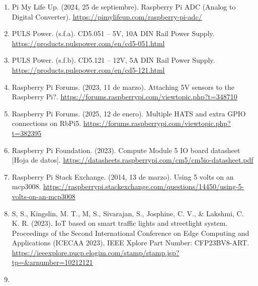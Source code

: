 \documentclass[12pt,a4paper,oneside]{report}
\providecommand{\ul}[1]{\underline{#1}}
\begin{document}
\begin{enumerate}
  Pasajero7. (2023). Semáforos inteligentes: La clave para ciudades más eficientes y seguras. \href{https://www.pasajero7.com/semaforos-inteligentes-la-clave-para-ciudades-mas-eficientes-y-seguras/}{\ul{https://www.pasajero7.com/semaforos-inteligentes-la-clave-para-ciudades-mas-eficientes-y-seguras/}}
\item
  Pi My Life Up. (2024, 25 de septiembre). Raspberry Pi ADC (Analog to Digital Converter). \href{https://pimylifeup.com/raspberry-pi-adc/}{\ul{https://pimylifeup.com/raspberry-pi-adc/}}
\item
  PULS Power. (s.f.a). CD5.051 -- 5V, 10A DIN Rail Power Supply. \href{https://products.pulspower.com/en/cd5-051.html}{\ul{https://products.pulspower.com/en/cd5-051.html}}
\item
  PULS Power. (s.f.b). CD5.121 -- 12V, 5A DIN Rail Power Supply. \href{https://products.pulspower.com/en/cd5-121.html}{\ul{https://products.pulspower.com/en/cd5-121.html}}
\item
  Raspberry Pi Forums. (2023, 11 de marzo). Attaching 5V sensors to the Raspberry Pi?. \href{https://forums.raspberrypi.com/viewtopic.php?t=348710}{\ul{https://forums.raspberrypi.com/viewtopic.php?t=348710}}
\item
  Raspberry Pi Forums. (2025, 12 de enero). Multiple HATS and extra GPIO connections on RbPi5. \href{https://forums.raspberrypi.com/viewtopic.php?t=382395}{\ul{https://forums.raspberrypi.com/viewtopic.php?t=382395}}
\item
  Raspberry Pi Foundation. (2023). Compute Module 5 IO board datasheet {[}Hoja de datos{]}. \href{https://datasheets.raspberrypi.com/cm5/cm5io-datasheet.pdf}{\ul{https://datasheets.raspberrypi.com/cm5/cm5io-datasheet.pdf}}
\item
  Raspberry Pi Stack Exchange. (2014, 13 de marzo). Using 5 volts on an mcp3008. \href{https://raspberrypi.stackexchange.com/questions/14450/using-5-volts-on-an-mcp3008}{\ul{https://raspberrypi.stackexchange.com/questions/14450/using-5-volts-on-an-mcp3008}}
\item
  S, S., Kingslin, M. T., M, S., Sivarajan, S., Josphine, C. V., \& Lakshmi, C. K. R. (2023). IoT based on smart traffic lights and streetlight system. Proceedings of the Second International Conference on Edge Computing and Applications (ICECAA 2023), IEEE Xplore Part Number: CFP23BV8-ART. \href{https://ieeexplore.pucp.elogim.com/stamp/stamp.jsp?tp=&arnumber=10212121}{\ul{https://ieeexplore.pucp.elogim.com/stamp/stamp.jsp?tp=\&arnumber=10212121}}
\item

\end{enumerate}
\end{document}
